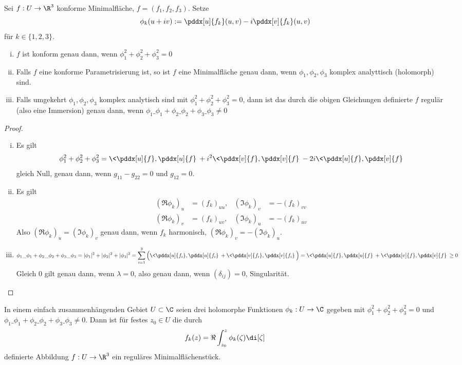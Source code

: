 \begin{st}
	Sei $f: U \to \R^3$ konforme Minimalfläche, $f = (f_1, f_2, f_3)$.
	Setze
	\[
		\phi_k(u + iv) := \pddx[u]{f_k}(u,v) - i \pddx[v]{f_k}(u,v)
	\]
	für $k \in \{1, 2, 3\}$.
	\begin{enumerate}[(i)]
		\item
			$f$ ist konform genau dann, wenn $\phi_1^2 + \phi_2^2 + \phi_3^2 = 0$
		\item
			Falls $f$ eine konforme Parametrisierung ist, so ist $f$ eine Minimalfläche genau dann, wenn $\phi_1, \phi_2, \phi_3$ komplex analyttisch (holomorph) sind.
		\item
			Falls umgekehrt $\phi_1, \phi_2, \phi_3$ komplex analytisch sind mit $\phi_1^2 + \phi_2^2 + \phi_3^2 = 0$, dann ist das durch die obigen Gleichungen definierte $f$ regulär (also eine Immersion) genau dann, wenn $\phi_1\_\phi_1 + \phi_2\_\phi_2 + \phi_3\_\phi_3 \neq 0$
	\end{enumerate}
	\begin{proof}
		\begin{enumerate}[(i)]
			\item
				Es gilt
				\[
					\phi_1^2 + \phi_2^2 + \phi_3^2
					= \< \pddx[u]{f}, \pddx[u]{f} \> + i^2 \<\pddx[v]{f}, \pddx[v]{f}\> - 2i \< \pddx[u]{f}, \pddx[v]{f}
				\]
				gleich Null, genau dann, wenn $g_{11} - g_{22} = 0$ und $g_{12} = 0$.
			\item
				Es gilt
				\begin{align*}
					(\Re \phi_k)_u &= (f_k)_{uu}, & (\Im \phi_k)_v &= - (f_k)_{vv} \\
					(\Re \phi_k)_v &= (f_k)_{uv}, & (\Im \phi_k)_u &= - (f_k)_{uv}
				\end{align*}
				Also $(\Re \phi_k)_u = (\Im \phi_k)_v$ genau dann, wenn $f_k$ harmonisch, $(\Re \phi_k)_v = -(\Im \phi_k)_u$.
			\item
				\[
					\phi_1 \_\phi_1 + \phi_2 \_\phi_2 + \phi_3 \_\phi_3
					= |\phi_1|^2 + |\phi_2|^2 + |\phi_3|^2
					= \sum_{i=1}^3 \Big( \<\pddx[u]{f_i}, \pddx[u]{f_i} \> + \<\pddx[v]{f_i}, \pddx[v]{f_i} \> \Big)
					= \< \pddx[u]{f}, \pddx[u]{f} \> + \< \pddx[v]{f}, \pddx[v]{f} \>
					\ge 0
				\]
				Gleich 0 gilt genau dann, wenn $\lambda = 0$, also genau dann, wenn $(\delta_{ij}) = 0$, Singularität.
		\end{enumerate}
	\end{proof}
\end{st}

\begin{kor}
	In einem einfach zusammenhängenden Gebiet $U \subset \C$ seien drei holomorphe Funktionen $\phi_k: U \to \C$ gegeben mit $\phi_1^2 + \phi_2^2 + \phi_3^2 = 0$ und $\phi_1\_\phi_1 + \phi_2 \_\phi_2 + \phi_3 \_\phi_3 \neq 0$.
	Dann ist für festes $z_0 \in U$ die durch
	\[
		f_k(z) = \Re \int_{z_0}^z \phi_k(\zeta) \di[\zeta]
	\]
	definierte Abbildung $f: U \to \R^3$ ein reguläres Minimalflächenstück.
\end{kor}

